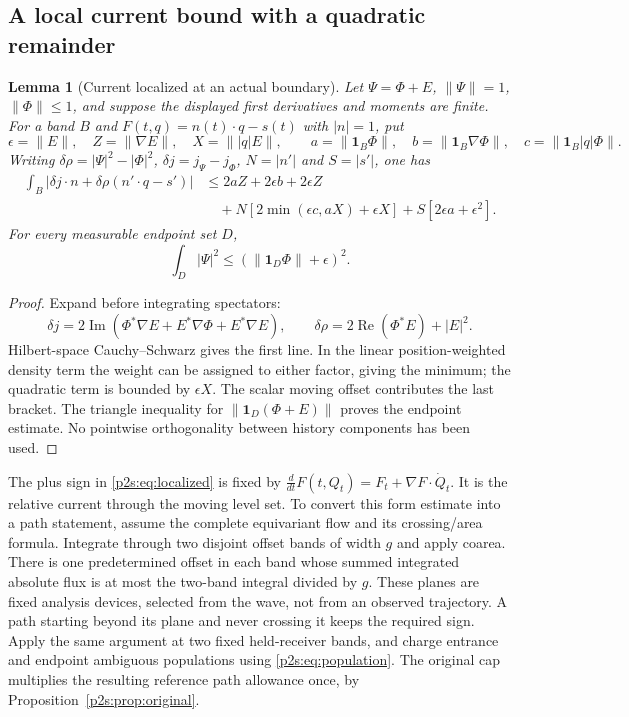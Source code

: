 \documentclass[11pt]{article}
\numberwithin{equation}{section}
\newtheorem{lemma}[theorem]{Lemma}
\theoremstyle{definition}
\theoremstyle{remark}
\begin{document}
\subsection{A local current bound with a quadratic remainder}
\begin{lemma}[Current localized at an actual boundary]
\label{p2s:lem:localized}
Let $\Psi=\Phi+E$, $\|\Psi\|=1$, $\|\Phi\|\leq1$, and suppose the displayed
first derivatives and moments are finite. For a band $B$ and
$F(t,q)=n(t)\cdot q-s(t)$ with $|n|=1$, put
\[
 \epsilon=\|E\|,\quad Z=\|\nabla E\|,\quad X=\||q|E\|,
 \qquad a=\|\mathbf1_B\Phi\|,\quad
 b=\|\mathbf1_B\nabla\Phi\|,\quad c=\|\mathbf1_B|q|\Phi\|.
\]
Writing $\delta\rho=|\Psi|^2-|\Phi|^2$, $\delta j=j_\Psi-j_\Phi$,
$N=|n'|$ and $S=|s'|$, one has
\begin{align}\label{p2s:eq:localized}
 \int_B|\delta j\cdot n+\delta\rho(n'\cdot q-s')|
 &\leq2aZ+2\epsilon b+2\epsilon Z\\
 &\quad+N[2\min(\epsilon c,aX)+\epsilon X]
       +S[2\epsilon a+\epsilon^2].\nonumber
\end{align}
For every measurable endpoint set $D$,
\begin{equation}\label{p2s:eq:population}
 \int_D|\Psi|^2\leq(\|\mathbf1_D\Phi\|+\epsilon)^2.
\end{equation}
\end{lemma}
\begin{proof}
Expand before integrating spectators:
\[
 \delta j=2\operatorname{Im}
 (\Phi^*\nabla E+E^*\nabla\Phi+E^*\nabla E),\qquad
 \delta\rho=2\operatorname{Re}(\Phi^*E)+|E|^2.
\]
Hilbert-space Cauchy--Schwarz gives the first line. In the linear
position-weighted density term the weight can be assigned to either
factor, giving the minimum; the quadratic term is bounded by $\epsilon X$.
The scalar moving offset contributes the last bracket. The triangle
inequality for $\|\mathbf1_D(\Phi+E)\|$ proves the endpoint estimate.
No pointwise orthogonality between history components has been used.
\end{proof}

The plus sign in \eqref{p2s:eq:localized} is fixed by
$\frac{d}{dt}F(t,Q_t)=F_t+\nabla F\cdot\dot Q_t$.
It is the relative current through the moving level set. To convert this
form estimate into a path statement, assume the complete equivariant flow
and its crossing/area formula. Integrate through two disjoint offset bands
of width $g$ and apply coarea. There is one predetermined offset in each
band whose summed integrated absolute flux is at most the two-band
integral divided by $g$. These planes are fixed analysis devices, selected
from the wave, not from an observed trajectory. A path starting beyond
its plane and never crossing it keeps the required sign. Apply the same
argument at two fixed held-receiver bands, and charge entrance and endpoint
ambiguous populations using \eqref{p2s:eq:population}. The original cap
multiplies the resulting reference path allowance once, by
Proposition~\ref{p2s:prop:original}.
\end{document}
